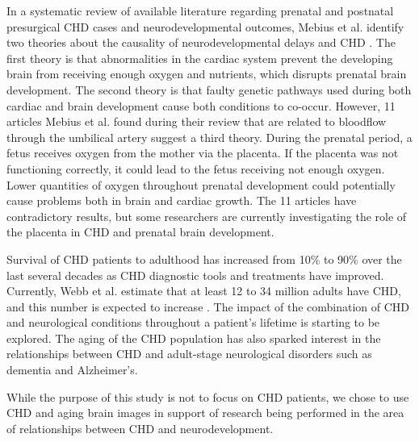 In a systematic review of available literature regarding prenatal and postnatal presurgical CHD cases and neurodevelopmental outcomes, Mebius et al. identify two theories about the causality of  neurodevelopmental delays and CHD \cite{Mebius2017}. The first theory is that abnormalities in the cardiac system prevent the developing brain from receiving enough oxygen and nutrients, which disrupts prenatal brain development. The second theory is that faulty genetic pathways used during both cardiac and brain development cause both conditions to co-occur. However, 11 articles Mebius et al. found during their review that are related to bloodflow through the umbilical artery suggest a third theory. During the prenatal period, a fetus receives oxygen from the mother via the placenta. If the placenta was not functioning correctly, it could lead to the fetus receiving not enough oxygen. Lower quantities of oxygen throughout prenatal development could potentially cause problems both in brain and cardiac growth. The 11 articles have contradictory results, but some researchers are currently investigating the role of the placenta in CHD and prenatal brain development.

Survival of CHD patients to adulthood has increased from 10\% to 90\% over the last several decades as CHD diagnostic tools and treatments have improved.  Currently, Webb et al. estimate that at least 12 to 34 million adults have CHD, and this number is expected to increase \cite{Webb2015}. The impact of the combination of CHD and neurological conditions throughout a patient's lifetime is starting to be explored. The aging of the CHD population has also sparked interest in the relationships between CHD and adult-stage neurological disorders such as dementia and Alzheimer's. 

While the purpose of this study is not to focus on CHD patients, we chose to use CHD and aging brain images in support of research being performed in the area of relationships between CHD and neurodevelopment.



